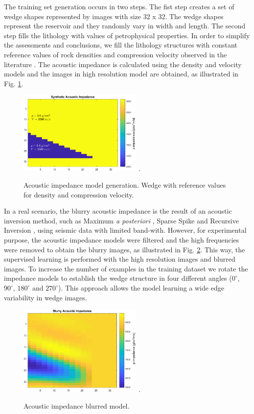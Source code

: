\documentclass[conference]{IEEEtran}
\begin{document}
The training set generation occurs in two steps.
The fist step creates a set of wedge shapes represented
by images with size $32$ x $32$. The wedge shapes represent the reservoir and they
randomly vary in width and length. The second step fills the lithology with values of petrophysical properties.
In order to simplify the assessments and conclusions, we fill the lithology structures with constant
reference values of rock densities and compression velocity observed in the literature \cite{Mavko2009}.
The acoustic impedance is calculated using the density and velocity models and the images in high
resolution model are obtained, as illustrated in  Fig. \ref{fig_lithology}.
\begin{figure}[!t]
\centering
\includegraphics[width=2.4in]{Figs/image_cunha}
\DeclareGraphicsExtensions.
\caption{Acoustic impedance model generation. Wedge with reference values for density and compression velocity.}
\label{fig_lithology}
\end{figure}

In a real scenario, the blurry acoustic impedance is the
result of an acoustic inversion method, such as Maximum \textit{a posteriori} \cite{Buland2003,Figueiredo2012}, Sparse Spike \cite{Debeye1990} 
and Recursive Inversion \cite{Chopra2001}, using seismic data with limited band-with.
However, for experimental purpose, the acoustic impedance models were filtered
and the high frequencies were removed to obtain the blurry images, as illustrated in Fig. \ref{fig_blur}.
This way, the supervised learning is performed with the high resolution images and blurred images.
To increase the number of examples in the training dataset we rotate
the impedance models to establish the wedge structure in four different angles
($0^{\circ}$, $90^{\circ}$, $180^{\circ}$ and $270^{\circ}$).
This approach allows the model learning a wide edge variability in wedge images.
\begin{figure}[!t]
\centering
\includegraphics[width=2.4in]{Figs/image_cunha_blurry}
\DeclareGraphicsExtensions.
\caption{Acoustic impedance blurred model.}
\label{fig_blur}
\end{figure}
\end{document}
